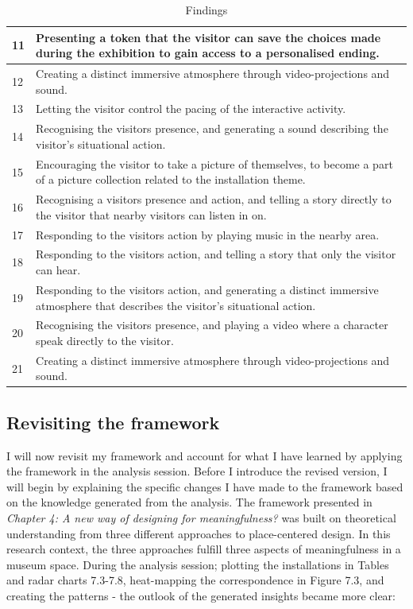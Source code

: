 \begin{table}[H]
\begin{tabular}{| p{0.75cm} | p{11cm}| }
\hline
11 & Presenting a token that the visitor can save the choices made during the exhibition to gain access to a personalised ending.\\
\hline
12 &  Creating a distinct immersive atmosphere through video-projections and sound.\\
\hline
13 & Letting the visitor control the pacing of the interactive activity.\\
\hline
14 & Recognising the visitors presence, and generating a sound describing the visitor's situational action.\\
\hline
15 & Encouraging the visitor to take a picture of themselves, to become a part of a picture collection related to the installation theme.\\
\hline
16 & Recognising a visitors presence and action, and telling a story directly to the visitor that nearby visitors can listen in on.\\
\hline
17 & Responding to the visitors action by playing music in the nearby area.\\
\hline
18 & Responding to the visitors action, and telling a story that only the visitor can hear.\\
\hline
19 & Responding to the visitors action, and generating a distinct immersive atmosphere that describes the visitor's situational action.\\
\hline
20 & Recognising the visitors presence, and playing a video where a character speak directly to the visitor.\\
\hline
21 & Creating a distinct immersive atmosphere through video-projections and sound.\\
\hline
\end{tabular}
\caption{Findings}
\end{table}

\subsection{Revisiting the framework}
I will now revisit my framework and account for what I have learned by applying the framework in the analysis session. Before I introduce the revised version, I will begin by explaining the specific changes I have made to the framework based on the knowledge generated from the analysis. The framework presented in \textit{Chapter 4: A new way of designing for meaningfulness?} was built on theoretical understanding from three different approaches to place-centered design. In this research context, the three approaches fulfill three aspects of meaningfulness in a museum space. During the analysis session; plotting the installations in Tables and radar charts 7.3-7.8, heat-mapping the correspondence in Figure 7.3, and creating the patterns - the outlook of the generated insights became more clear:

